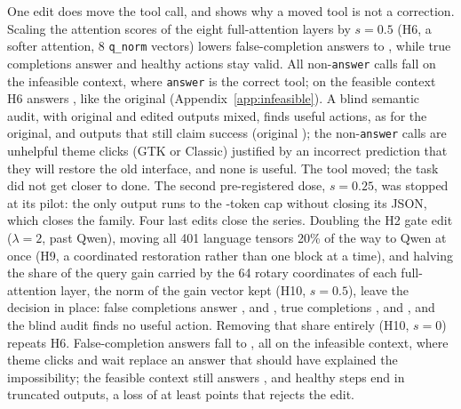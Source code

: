 One edit does move the tool call, and shows why a moved tool is not a correction. Scaling the attention scores of the eight full-attention layers by $s=0.5$ (H6, a softer attention, 8 \texttt{q\_norm} vectors) lowers false-completion answers to \attHsixFsp, while true completions answer \attHsixFsm{} and healthy actions stay valid. All \infHsixNonAnswer{} non-\texttt{answer} calls fall on the infeasible context, where \texttt{answer} is the correct tool; on the feasible \fsp{} context H6 answers \infFreeHsixExcl, like the original (Appendix~\ref{app:infeasible}). %
A blind semantic audit, with original and edited outputs mixed, finds \attHsixAuditUseful{} useful actions, as for the original, and \attHsixAuditFalse{} outputs that still claim success (original \attOrigAuditFalse); the \attHsixTheme{} non-\texttt{answer} calls are unhelpful theme clicks (GTK or Classic) justified by an incorrect prediction that they will restore the old interface, and none is useful. The tool moved; the task did not get closer to done. %
The second pre-registered dose, $s=0.25$, was stopped at its pilot: the only output runs to the \hsixQuarterTokens-token cap without closing its JSON, which closes the family. %
Four last edits close the series. Doubling the H2 gate edit ($\lambda=2$, past Qwen), moving all 401 language tensors 20\% of the way to Qwen at once (H9, a coordinated restoration rather than one block at a time), and halving the share of the query gain carried by the 64 rotary coordinates of each full-attention layer, the norm of the gain vector kept (H10, $s=0.5$), leave the decision in place: false completions answer \attHtwotwoFsp, \attHnineFsp{} and \attHtenhalfFsp, true completions \attHtwotwoFsm, \attHnineFsm{} and \attHtenhalfFsm, and the blind audit finds no useful action. Removing that share entirely (H10, $s=0$) repeats H6. False-completion answers fall to \attHtenzeroFsp, all on the infeasible context, where \attHtenzeroInfClick{} theme clicks and \attHtenzeroInfWait{} wait replace an answer that should have explained the impossibility; the feasible context still answers \infFreeHtenzeroExcl, and \attHtenzeroHealthyTrunc{} healthy steps end in truncated outputs, a loss of at least \attHtenzeroHealthyLoss{} points that rejects the edit. %

